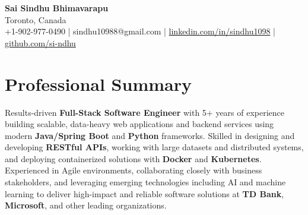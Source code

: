 \documentclass[letterpaper,11pt]{article}
\begin{document}
\begin{center}
  {\Large \textbf{Sai Sindhu Bhimavarapu}} \\
  Toronto, Canada \\
  +1-902-977-0490 \enspace | \enspace sindhu10988@gmail.com \enspace | \enspace \href{https://www.linkedin.com/in/sindhu1098/}{linkedin.com/in/sindhu1098} \enspace | \enspace \href{https://github.com/si-ndhu}{github.com/si-ndhu}
\end{center}

\section{Professional Summary}
  \begin{itemize}[leftmargin=0.15in, label={}]
    \small{\item{
     Results-driven \textbf{Full-Stack Software Engineer} with 5+ years of experience building scalable, data-heavy web applications and backend services using modern \textbf{Java/Spring Boot} and \textbf{Python} frameworks. Skilled in designing and developing \textbf{RESTful APIs}, working with large datasets and distributed systems, and deploying containerized solutions with \textbf{Docker} and \textbf{Kubernetes}. Experienced in Agile environments, collaborating closely with business stakeholders, and leveraging emerging technologies including AI and machine learning to deliver high-impact and reliable software solutions at \textbf{TD Bank}, \textbf{Microsoft}, and other leading organizations.
    }}
  \end{itemize}
\vspace{-16pt}

\end{document}
